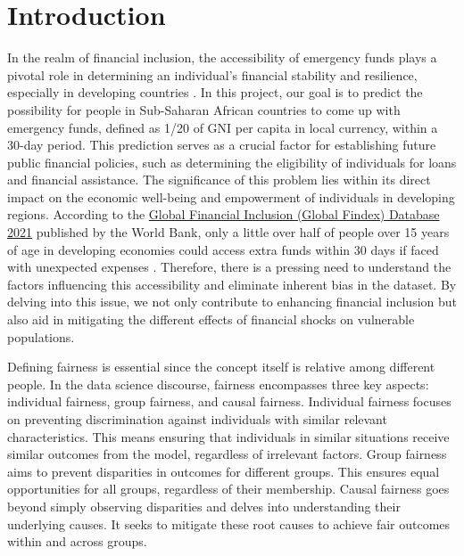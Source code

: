 \documentclass[12pt]{article}
\begin{document}
\vfill

\newpage
{} %

\hypertarget{introduction}{%
\section{Introduction}\label{introduction}}

In the realm of financial inclusion, the accessibility of emergency
funds plays a pivotal role in determining an individual's financial
stability and resilience, especially in developing countries
\citep{10.1093/oso/9780198827535.003.0007}. In this project, our goal is
to predict the possibility for people in Sub-Saharan African countries
to come up with emergency funds, defined as 1/20 of GNI per capita in
local currency, within a 30-day period\citep{Demirguc-Kunt2022}. This
prediction serves as a crucial factor for establishing future public
financial policies, such as determining the eligibility of individuals
for loans and financial assistance. The significance of this problem
lies within its direct impact on the economic well-being and empowerment
of individuals in developing regions. According to the
\href{https://www.worldbank.org/en/publication/globalfindex}{Global
Financial Inclusion (Global Findex) Database 2021} published by the
World Bank, only a little over half of people over 15 years of age in
developing economies could access extra funds within 30 days if faced
with unexpected expenses \citep{Demirguc-Kunt2022}. Therefore, there is
a pressing need to understand the factors influencing this accessibility
and eliminate inherent bias in the dataset. By delving into this issue,
we not only contribute to enhancing financial inclusion but also aid in
mitigating the different effects of financial shocks on vulnerable
populations.

Defining fairness is essential since the concept itself is relative
among different people. In the data science discourse, fairness
encompasses three key aspects: individual fairness, group fairness, and
causal fairness\citep{Kypraiou2021What}. Individual fairness focuses on
preventing discrimination against individuals with similar relevant
characteristics. This means ensuring that individuals in similar
situations receive similar outcomes from the model, regardless of
irrelevant factors\citep{10.1145/3461702.3462621}. Group fairness aims
to prevent disparities in outcomes for different groups. This ensures
equal opportunities for all groups, regardless of their
membership\citep{10.1145/3442188.3445876}. Causal fairness goes beyond
simply observing disparities and delves into understanding their
underlying causes. It seeks to mitigate these root causes to achieve
fair outcomes within and across groups\citep{plecko2022causal}.
\end{document}
